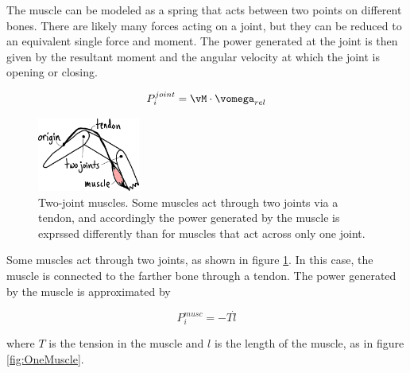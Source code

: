 The muscle can be modeled as a spring that acts between two points on different bones. There are likely many forces acting on a joint, but they can be reduced to an equivalent single force and moment. The power generated at the joint is then given by the resultant moment and the angular velocity at which the joint is opening or closing.

\begin{equation}
P_{i}^{joint} = \vM \cdot \vomega_{rel}
\end{equation}

\begin{figure}[h]		%
\begin{centering}
\includegraphics[width=0.3\textwidth]{Figures/TwoJoints}\par
\end{centering}
\caption[Diagram: Two-Joint Muscles]{Two-joint muscles. Some muscles act through two joints via a tendon, and accordingly the power generated by the muscle is exprssed differently than for muscles that act across only one joint.}
\label{fig:TwoJoints}
\end{figure}
%

Some muscles act through two joints, as shown in figure \ref{fig:TwoJoints}. In this case, the muscle is connected to the farther bone through a tendon. The power generated by the muscle is approximated by

\begin{equation}
P_{i}^{musc} = - T \dot{l}
\end{equation}

where $T$ is the tension in the muscle and $l$ is the length of the muscle, as in figure \ref{fig:OneMuscle}.

